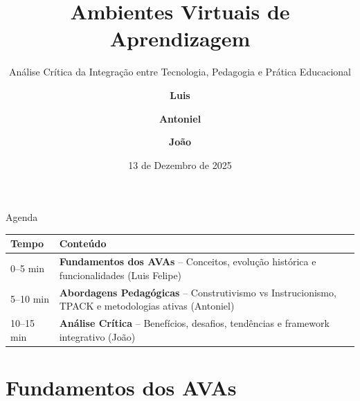 \documentclass[aspectratio=169,xcolor=table]{beamer}
\author[Luis, Antoniel, João]{%
  \textbf{Luis} \and \textbf{Antoniel} \and \textbf{João}
}
\title{Ambientes Virtuais de Aprendizagem}
\subtitle{Análise Crítica da Integração entre Tecnologia, Pedagogia e Prática Educacional}
\institute{Universidade Federal da Bahia \\ Instituto de Computação}
\date{13 de Dezembro de 2025}
\begin{document}
\begin{frame}
    \titlepage
\end{frame}

\begin{frame}{Agenda}
    \begin{table}
        \begin{tabularx}{\textwidth}{|l|X|}
            \hline
            \textbf{Tempo} & \textbf{Conteúdo} \\
            \hline
            0--5 min  & \textbf{Fundamentos dos AVAs} -- Conceitos, evolução histórica e funcionalidades (Luis Felipe) \\
            \hline
            5--10 min & \textbf{Abordagens Pedagógicas} -- Construtivismo vs Instrucionismo, TPACK e metodologias ativas (Antoniel) \\
            \hline
            10--15 min & \textbf{Análise Crítica} -- Benefícios, desafios, tendências e framework integrativo (João) \\
            \hline
        \end{tabularx}
    \end{table}
\end{frame}

\setlength{\parskip}{0.8em}

\section{Fundamentos dos AVAs}
\end{document}
